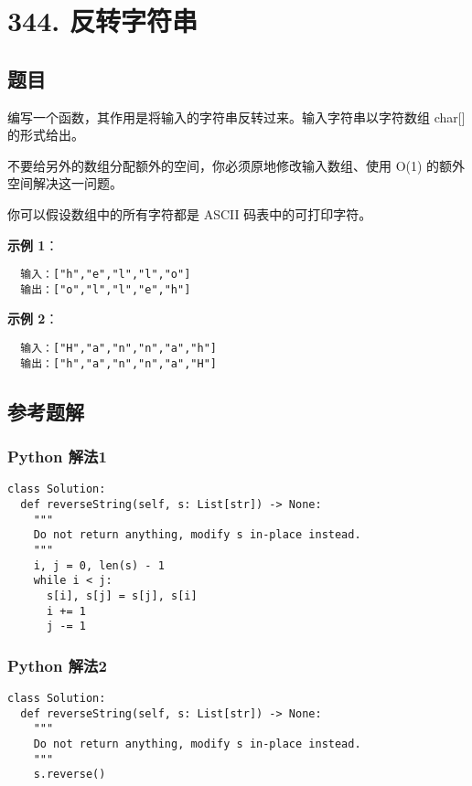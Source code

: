 \newpage
\section{344. 反转字符串}
\label{leetcode:344}

\subsection{题目}

编写一个函数，其作用是将输入的字符串反转过来。输入字符串以字符数组 char[] 的形式给出。

不要给另外的数组分配额外的空间，你必须原地修改输入数组、使用 O(1) 的额外空间解决这一问题。

你可以假设数组中的所有字符都是 ASCII 码表中的可打印字符。

\textbf{示例 1}：

\begin{verbatim}
  输入：["h","e","l","l","o"]
  输出：["o","l","l","e","h"]
\end{verbatim}

\textbf{示例 2}：

\begin{verbatim}
  输入：["H","a","n","n","a","h"]
  输出：["h","a","n","n","a","H"]
\end{verbatim}

\subsection{参考题解}

\subsubsection{Python 解法1}

\begin{verbatim}
class Solution:
  def reverseString(self, s: List[str]) -> None:
    """
    Do not return anything, modify s in-place instead.
    """
    i, j = 0, len(s) - 1
    while i < j:
      s[i], s[j] = s[j], s[i]
      i += 1
      j -= 1
\end{verbatim}

\subsubsection{Python 解法2}

\begin{verbatim}
class Solution:
  def reverseString(self, s: List[str]) -> None:
    """
    Do not return anything, modify s in-place instead.
    """
    s.reverse()
\end{verbatim}
